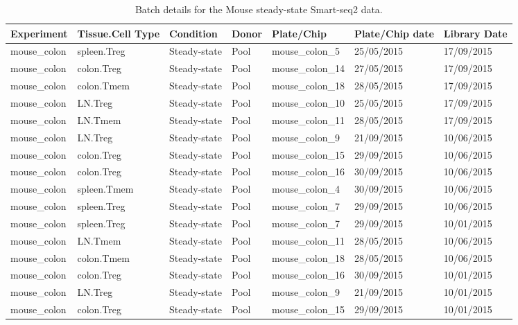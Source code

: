 \begin{table}[H]
\scriptsize
\caption[Batch details for the Mouse steady-state Smart-seq2 data]{Batch details for the Mouse steady-state Smart-seq2 data.}
\centering
\label{table:tab_A_batch_SS2_SS}
\begin{tabular}{lllllll}
  \toprule
Experiment & Tissue.Cell Type & Condition & Donor & Plate/Chip & Plate/Chip date & Library Date \\ 
  \midrule
  mouse\_colon & spleen.Treg & Steady-state & Pool & mouse\_colon\_5 & 25/05/2015 & 17/09/2015 \\ 
  mouse\_colon & colon.Treg & Steady-state & Pool & mouse\_colon\_14 & 27/05/2015 & 17/09/2015 \\ 
  mouse\_colon & colon.Tmem & Steady-state & Pool & mouse\_colon\_18 & 28/05/2015 & 17/09/2015 \\ 
  mouse\_colon & LN.Treg & Steady-state & Pool & mouse\_colon\_10 & 25/05/2015 & 17/09/2015 \\ 
  mouse\_colon & LN.Tmem & Steady-state & Pool & mouse\_colon\_11 & 28/05/2015 & 17/09/2015 \\ 
  mouse\_colon & LN.Treg & Steady-state & Pool & mouse\_colon\_9 & 21/09/2015 & 10/06/2015 \\ 
  mouse\_colon & colon.Treg & Steady-state & Pool & mouse\_colon\_15 & 29/09/2015 & 10/06/2015 \\ 
  mouse\_colon & colon.Treg & Steady-state & Pool & mouse\_colon\_16 & 30/09/2015 & 10/06/2015 \\ 
  mouse\_colon & spleen.Tmem & Steady-state & Pool & mouse\_colon\_4 & 30/09/2015 & 10/06/2015 \\ 
  mouse\_colon & spleen.Treg & Steady-state & Pool & mouse\_colon\_7 & 29/09/2015 & 10/06/2015 \\ 
  mouse\_colon & spleen.Treg & Steady-state & Pool & mouse\_colon\_7 & 29/09/2015 & 10/01/2015 \\ 
  mouse\_colon & LN.Tmem & Steady-state & Pool & mouse\_colon\_11 & 28/05/2015 & 10/06/2015 \\ 
  mouse\_colon & colon.Tmem & Steady-state & Pool & mouse\_colon\_18 & 28/05/2015 & 10/06/2015 \\ 
  mouse\_colon & colon.Treg & Steady-state & Pool & mouse\_colon\_16 & 30/09/2015 & 10/01/2015 \\ 
  mouse\_colon & LN.Treg & Steady-state & Pool & mouse\_colon\_9 & 21/09/2015 & 10/01/2015 \\ 
  mouse\_colon & colon.Treg & Steady-state & Pool & mouse\_colon\_15 & 29/09/2015 & 10/01/2015 \\ 

\end{tabular}
\end{table}
